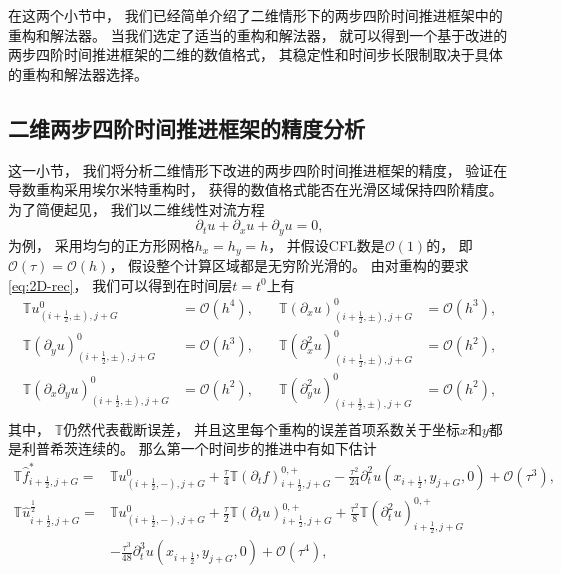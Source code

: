 \vspace{\baselineskip} %
在这两个小节中，
我们已经简单介绍了二维情形下的两步四阶时间推进框架中的重构和解法器。
当我们选定了适当的重构和解法器，
就可以得到一个基于改进的两步四阶时间推进框架的二维的数值格式，
其稳定性和时间步长限制取决于具体的重构和解法器选择。

\subsection{二维两步四阶时间推进框架的精度分析}

这一小节，
我们将分析二维情形下改进的两步四阶时间推进框架的精度，
验证在导数重构采用埃尔米特重构时，
获得的数值格式能否在光滑区域保持四阶精度。
为了简便起见，
我们以二维线性对流方程
\begin{equation}
  {\partial_{t}} u + {\partial_{x}} u + {\partial_{y}} u = 0,
\end{equation}
为例，
采用均匀的正方形网格$h_x=h_y=h$，
并假设CFL数是$\mathcal{O}(1)$的，
即$\mathcal{O}(\tau)=\mathcal{O}(h)$，
假设整个计算区域都是无穷阶光滑的。
由对重构的要求 \cref{eq:2D-rec}，
我们可以得到在时间层$t=t^0$上有
\begin{equation}
  \begin{aligned}
    {\mathbb{T}} u_{(i+\frac{1}{2},\pm), j+G}^0                                             & ={\mathcal{O}}(h^4), & \quad
    {\mathbb{T}} \left({\partial_{x}} u\right)_{(i+\frac{1}{2},\pm), j+G}^{0}               & ={\mathcal{O}}(h^3),          \\
    {\mathbb{T}} \left({\partial_{y}} u\right)_{(i+\frac{1}{2},\pm), j+G}^{0}               & ={\mathcal{O}}(h^3), & \quad
    {\mathbb{T}} \left({\partial_{x}^2} u\right)_{(i+\frac{1}{2},\pm), j+G}^{0}             & ={\mathcal{O}}(h^2),          \\
    {\mathbb{T}} \left({\partial_{x}}{\partial_{y}} u\right)_{(i+\frac{1}{2},\pm), j+G}^{0} & ={\mathcal{O}}(h^2), & \quad
    {\mathbb{T}} \left({\partial_{y}^2} u\right)_{(i+\frac{1}{2},\pm), j+G}^{0}             & ={\mathcal{O}}(h^2),          \\
  \end{aligned}
\end{equation}
其中，
${\mathbb{T}}$仍然代表截断误差，
并且这里每个重构的误差首项系数关于坐标$x$和$y$都是利普希茨连续的。
那么第一个时间步的推进中有如下估计
\begin{align}
  {\mathbb{T}}\hat{f}^*_{i+\frac 12, j+G} =
   & {\mathbb{T}} u_{(i+\frac{1}{2},-), j+G}^{0}+\frac\tau4 {\mathbb{T}} \left({\partial_{t}} f\right)_{i+\frac 12, j+G}^{0,+} - \frac{\tau^2}{24} {\partial_{t}^2} u(x_{i+\frac 12}, y_{j+G},0)+{\mathcal{O}}(\tau^3), \\
  {\mathbb{T}}\hat {u}^{\frac 12}_{i+\frac 12, j+G} =
   & {\mathbb{T}} u_{(i+\frac{1}{2},-), j+G}^{0}+\frac\tau2 {\mathbb{T}} \left({\partial_{t}} u\right)_{i+\frac 12, j+G}^{0,+} + \frac{\tau^2}{8} {\mathbb{T}} \left({\partial_{t}^2} u\right)_{i+\frac 12, j+G}^{0,+}  \\
  \nonumber
   & - \frac{\tau^3}{48}{\partial_{t}^3} u(x_{i+\frac 12}, y_{j+G},0)+{\mathcal{O}}(\tau^4),
\end{align}
